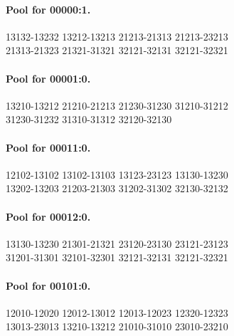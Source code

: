 \documentclass[11pt]{article}
\theoremstyle{remark}
\numberwithin{equation}{section}
\begin{document}
\paragraph{Pool for 00000:1.}
\begingroup\footnotesize\ttfamily\begin{flushleft}
13132-13232 13212-13213 21213-21313 21213-23213\\
21313-21323 21321-31321 32121-32131 32121-32321\\
\end{flushleft}\endgroup
\paragraph{Pool for 00001:0.}
\begingroup\footnotesize\ttfamily\begin{flushleft}
13210-13212 21210-21213 21230-31230 31210-31212\\
31230-31232 31310-31312 32120-32130\\
\end{flushleft}\endgroup
\paragraph{Pool for 00011:0.}
\begingroup\footnotesize\ttfamily\begin{flushleft}
12102-13102 13102-13103 13123-23123 13130-13230\\
13202-13203 21203-21303 31202-31302 32130-32132\\
\end{flushleft}\endgroup
\paragraph{Pool for 00012:0.}
\begingroup\footnotesize\ttfamily\begin{flushleft}
13130-13230 21301-21321 23120-23130 23121-23123\\
31201-31301 32101-32301 32121-32131 32121-32321\\
\end{flushleft}\endgroup
\paragraph{Pool for 00101:0.}
\begingroup\footnotesize\ttfamily\begin{flushleft}
12010-12020 12012-13012 12013-12023 12320-12323\\
13013-23013 13210-13212 21010-31010 23010-23210\\
\end{flushleft}\endgroup
\end{document}
